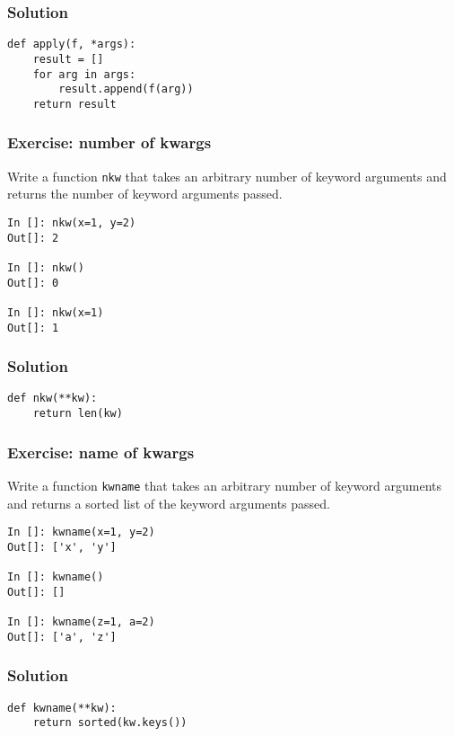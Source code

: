 \documentclass[14pt,compress,aspectratio=169]{beamer}
\begin{document}
\begin{frame}
  \frametitle{Solution}
\begin{lstlisting}
def apply(f, *args):
    result = []
    for arg in args:
        result.append(f(arg))
    return result
\end{lstlisting}
\end{frame}

\begin{frame}
  \frametitle{Exercise: number of kwargs}
  \begin{block}{}
    Write a function \lstinline{nkw} that takes an arbitrary number of
    keyword arguments and returns the number of keyword arguments passed.
  \end{block}

\begin{lstlisting}
In []: nkw(x=1, y=2)
Out[]: 2

In []: nkw()
Out[]: 0

In []: nkw(x=1)
Out[]: 1
\end{lstlisting}
\end{frame}


\begin{frame}
  \frametitle{Solution}
\begin{lstlisting}
def nkw(**kw):
    return len(kw)
\end{lstlisting}
\end{frame}

\begin{frame}
  \frametitle{Exercise: name of kwargs}
  \begin{block}{}
    Write a function \lstinline{kwname} that takes an arbitrary number of
    keyword arguments and returns a sorted list of the keyword arguments
    passed.
  \end{block}

\begin{lstlisting}
In []: kwname(x=1, y=2)
Out[]: ['x', 'y']

In []: kwname()
Out[]: []

In []: kwname(z=1, a=2)
Out[]: ['a', 'z']
\end{lstlisting}
\end{frame}


\begin{frame}
  \frametitle{Solution}
\begin{lstlisting}
def kwname(**kw):
    return sorted(kw.keys())
\end{lstlisting}
\end{frame}
\end{document}
